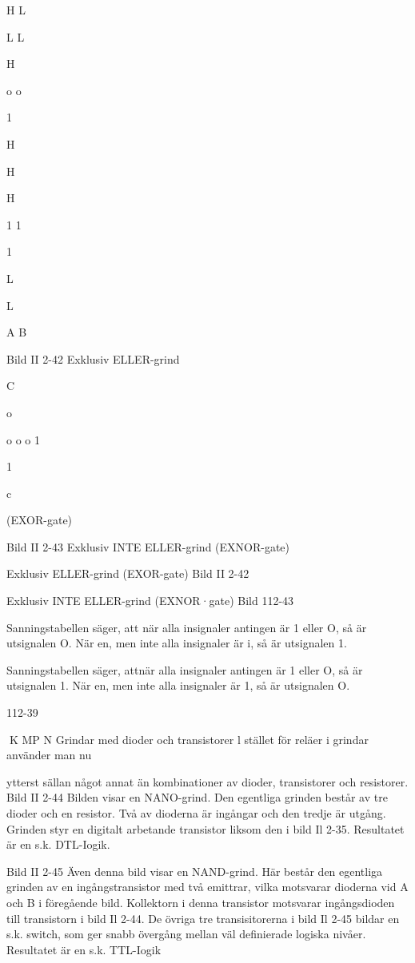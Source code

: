 {{H
L

L
L

H

o o

1

H

H

H

1
1

1

L

L

A
B

Bild II 2-42 Exklusiv ELLER-grind

C

o

o
o o
1

1

c

(EXOR-gate)

Bild II 2-43 Exklusiv INTE ELLER-grind
(EXNOR-gate)

Exklusiv ELLER-grind (EXOR-gate)
Bild II 2-42

Exklusiv INTE ELLER-grind (EXNOR·gate)
Bild 112-43

Sanningstabellen säger, att när alla insignaler antingen är 1 eller O, så är utsignalen O.
När en, men inte alla insignaler är i, så är
utsignalen 1.

Sanningstabellen säger, attnär alla insignaler
antingen är 1 eller O, så är utsignalen 1. När
en, men inte alla insignaler är 1, så är utsignalen O.

112-39

K MP N
Grindar med dioder och transistorer
l stället för reläer i grindar använder man nu

ytterst sällan något annat än kombinationer
av dioder, transistorer och resistorer.
Bild II 2-44
Bilden visar en NANO-grind. Den egentliga
grinden består av tre dioder och en resistor.
Två av dioderna är ingångar och den tredje
är utgång. Grinden styr en digitalt arbetande
transistor liksom den i bild Il 2-35. Resultatet
är en s.k. DTL-Iogik.

Bild II 2-45
Även denna bild visar en NAND-grind. Här
består den egentliga grinden av en ingångstransistor med två emittrar, vilka motsvarar
dioderna vid A och B i föregående bild.
Kollektorn i denna transistor motsvarar ingångsdioden till transistorn i bild Il 2-44.
De övriga tre transisitorerna i bild Il 2-45
bildar en s.k. switch, som ger snabb övergång mellan väl definierade logiska nivåer.
Resultatet är en s.k. TTL-Iogik

}}
